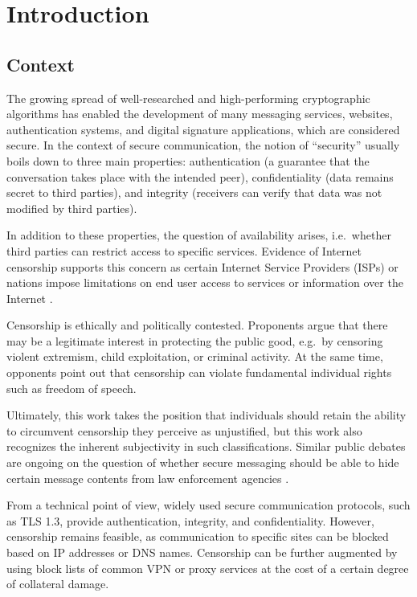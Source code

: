 \chapter{Introduction}\label{ch:introduction}

\section{Context} \label{sec:context}

The growing spread of well-researched and high-performing cryptographic algorithms has enabled the development of many messaging services, websites, authentication systems, and digital signature applications, which are considered secure.
In the context of secure communication, the notion of ``security'' usually boils down to three main properties: authentication (a guarantee that the conversation takes place with the intended peer), confidentiality (data remains secret to third parties), and integrity (receivers can verify that data was not modified by third parties).

In addition to these properties, the question of availability arises, i.e.~whether third parties can restrict access to specific services. Evidence of Internet censorship supports this concern as certain Internet Service Providers (ISPs) or nations impose limitations on end user access to services or information over the Internet \cite{master2023worldwide,SP:NCWHRC20,CCS:RSKE20}.

Censorship is ethically and politically contested. Proponents argue that there may be a legitimate interest in protecting the public good, e.g.~by censoring violent extremism, child exploitation, or criminal activity. At the same time, opponents point out that censorship can violate fundamental individual rights such as freedom of speech.

Ultimately, this work takes the position that individuals should retain the ability to circumvent censorship they perceive as unjustified, but this work also recognizes the inherent subjectivity in such classifications. Similar public debates are ongoing on the question of whether secure messaging should be able to hide certain message contents from law enforcement agencies \cite{menn2019facebook,townsend2025encryption}.

From a technical point of view, widely used secure communication protocols, such as TLS 1.3, provide authentication, integrity, and confidentiality. However, censorship remains feasible, as communication to specific sites can be blocked based on IP addresses or DNS names. Censorship can be further augmented by using block lists of common VPN or proxy services at the cost of a certain degree of collateral damage.

